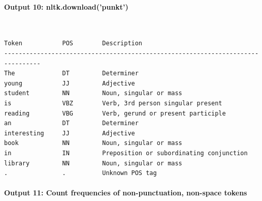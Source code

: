 \documentclass[12pt,a4paper,oneside]{report}
\begin{document}
\paragraph{Output 10: nltk.download('punkt')}\mbox{}\\[-1ex]
\begin{Verbatim}[commandchars=\\\{\},breaklines=true,breakanywhere=true,fontsize=\scriptsize,frame=leftline,framesep=2mm,rulecolor=\color{gray}]
Token           POS        Description
--------------------------------------------------------------------------------
The             DT         Determiner
young           JJ         Adjective
student         NN         Noun, singular or mass
is              VBZ        Verb, 3rd person singular present
reading         VBG        Verb, gerund or present participle
an              DT         Determiner
interesting     JJ         Adjective
book            NN         Noun, singular or mass
in              IN         Preposition or subordinating conjunction
library         NN         Noun, singular or mass
.               .          Unknown POS tag
\end{Verbatim}
\paragraph{Output 11: Count frequencies of non-punctuation, non-space tokens}\mbox{}\\[-1ex]
\end{document}
